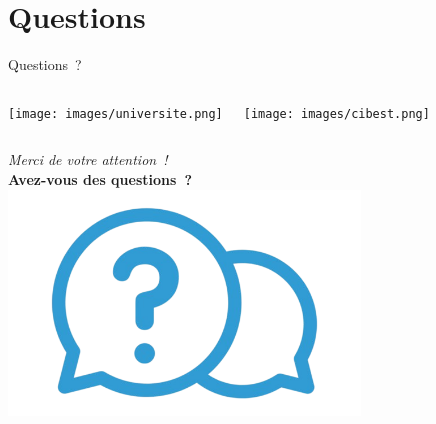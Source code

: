 \section*{Questions}
\begin{frame}{Questions~?}
  \vspace*{-0.3cm}
  \begin{columns}
    \begin{center}
      \texttt{[image: images/universite.png]}
    \end{center}
    
    \begin{center}
      \texttt{[image: images/cibest.png]}
    \end{center}
    
  \end{columns}
  \vspace*{0.2cm}
  
    \centering
    \emph{Merci de votre attention~!}\\
    \vspace{0.6cm}
    \textbf{Avez-vous des questions~?}
    \includegraphics[width=0.7\textwidth]{images/questions.png}
  \end{frame}
  